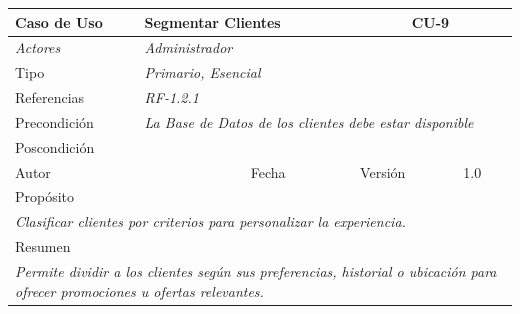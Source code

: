 \begin{table}[H]
\begin{tabular}{|llllllll|}
\hline
\multicolumn{1}{|l|}{\cellcolor[HTML]{F2F2F2}Caso de Uso} & \multicolumn{5}{l|}{Segmentar Clientes} & \multicolumn{2}{l|}{\cellcolor[HTML]{E6E6E6}CU-9} \\ \hline
\multicolumn{1}{|l|}{{\color[HTML]{808080} \textit{Actores}}} & \multicolumn{7}{l|}{{\color[HTML]{808080} \textit{Administrador}}} \\ \hline
\multicolumn{1}{|l|}{Tipo} & \multicolumn{7}{l|}{{\color[HTML]{808080} \textit{Primario, Esencial}}} \\ \hline
\multicolumn{1}{|l|}{Referencias} & \multicolumn{2}{l|}{{\color[HTML]{808080} \textit{RF-1.2.1}}} & \multicolumn{5}{l|}{} \\ \hline
\multicolumn{1}{|l|}{Precondición} & \multicolumn{7}{l|}{{\color[HTML]{808080} \textit{La Base de Datos de los clientes debe estar disponible}}} \\ \hline
\multicolumn{1}{|l|}{Poscondición} & \multicolumn{7}{l|}{} \\ \hline
\multicolumn{1}{|l|}{Autor} & \multicolumn{1}{l|}{} & \multicolumn{2}{l|}{Fecha} & \multicolumn{1}{l|}{} & \multicolumn{2}{l|}{Versión} & 1.0 \\ \hline
\multicolumn{8}{|l|}{Propósito} \\ \hline
\multicolumn{8}{|p{15cm}|}{{\color[HTML]{808080} \textit{Clasificar clientes por criterios para personalizar la experiencia.}}} \\ \hline
\multicolumn{8}{|l|}{Resumen} \\ \hline
\multicolumn{8}{|p{15cm}|}{{\color[HTML]{808080} \textit{Permite dividir a los clientes según sus preferencias, historial o ubicación para ofrecer promociones u ofertas relevantes.}}} \\ \hline
\end{tabular}
\end{table}

